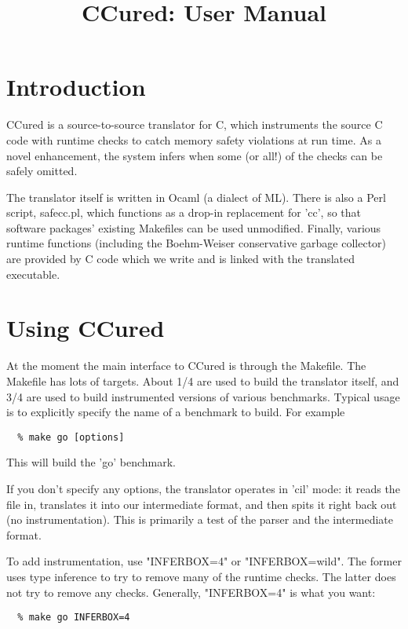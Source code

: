 \documentclass{book}
\title{CCured: User Manual}
\begin{document}
\maketitle
\chapter{Introduction}

CCured is a source-to-source translator for C, which instruments the source C
code with runtime checks to catch memory safety violations at run time. As a
novel enhancement, the system infers when some (or all!) of the checks can be
safely omitted.

The translator itself is written in Ocaml (a dialect of ML).  There is
also a Perl script, safecc.pl, which functions as a drop-in
replacement for 'cc', so that software packages' existing Makefiles
can be used unmodified.  Finally, various runtime functions (including
the Boehm-Weiser conservative garbage collector) are provided by C
code which we write and is linked with the translated executable.

\chapter{Using CCured}

 At the moment the main interface to CCured is through the Makefile. The
Makefile has lots of targets. About 1/4 are used to build the translator
itself, and 3/4 are used to build instrumented versions of various benchmarks.
Typical usage is to explicitly specify the name of a benchmark to build. For
example

\begin{verbatim}
  % make go [options]
\end{verbatim}

This will build the 'go' benchmark.

If you don't specify any options, the translator operates in 'cil' mode:
it reads the file in, translates it into our intermediate format, and
then spits it right back out (no instrumentation).  This is primarily a
test of the parser and the intermediate format.

To add instrumentation, use "INFERBOX=4" or "INFERBOX=wild".  The former
uses type inference to try to remove many of the runtime checks.  The
latter does not try to remove any checks.  Generally, "INFERBOX=4" is
what you want:

\begin{verbatim}
  % make go INFERBOX=4
\end{verbatim}
\end{document}
